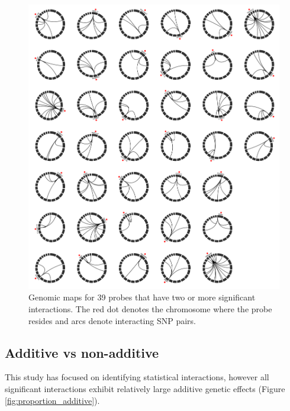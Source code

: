 \documentclass[paper=a4, fontsize=11pt]{scrartcl}	%
\numberwithin{equation}{section}									%
\numberwithin{figure}{section}										%
\numberwithin{table}{section}										%
\begin{document}
\begin{figure}[p]
	\centering
	\includegraphics[width=15cm]{images/circos}
	\caption{Genomic maps for 39 probes that have two or more significant interactions. The red dot denotes the chromosome where the probe resides and arcs denote interacting SNP pairs.}
	\label{fig:circos}
\end{figure}



\subsection{Additive vs non-additive}

This study has focused on identifying statistical interactions, however all significant interactions exhibit relatively large additive genetic effects (Figure \ref{fig:proportion_additive}).
\end{document}
